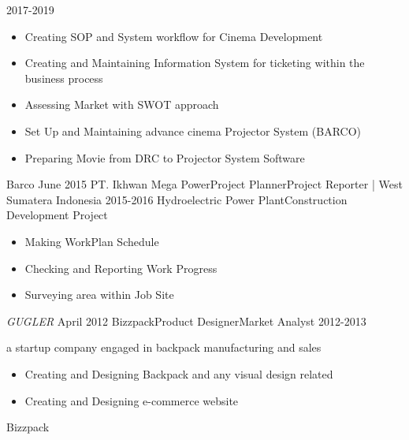 \begin{experiences}
    {2017-2019}    {
                      \begin{itemize}
                        \item Creating SOP and System workflow for Cinema Development
                        \item Creating and Maintaining Information System for ticketing within the business process                
                        \item Assessing Market with SWOT approach               
                        \item Set Up and Maintaining advance cinema Projector System (BARCO)                        
                        \item Preparing Movie from DRC to Projector System Software                                                  
                      \end{itemize}
                    }
                    {Barco}
  \emptySeparator
  \consultantexperience
  {June 2015}       {PT. Ikhwan Mega Power}{Project Planner}{Project Reporter | West Sumatera Indonesia}
  {2015-2016}      {Hydroelectric Power Plant}{Construction Development Project}
                    {
        
                      \begin{itemize}
                        \item Making WorkPlan Schedule                               
                        \item Checking and Reporting Work Progress           
                        \item Surveying area within Job Site                       
                      \end{itemize}
                    }
                    {\emph{GUGLER}}
  \emptySeparator
  \experience
  {April 2012}  {Bizzpack}{Product Designer}{Market Analyst}
  {2012-2013}   {
                      a startup company engaged in backpack manufacturing and sales  
                      \begin{itemize}
                        \item Creating and Designing Backpack and any visual design related                                            
                        \item Creating and Designing e-commerce website   
                      \end{itemize}
                  }
                  {Bizzpack}  
\end{experiences}
